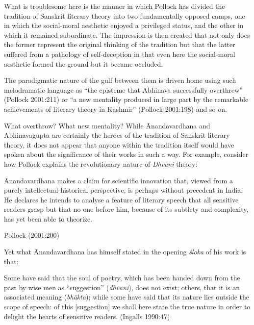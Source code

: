 What is troublesome here is the manner in which Pollock has divided the tradition of Sanskrit literary theory into two fundamentally opposed camps, one in which the social-moral aesthetic enjoyed a privileged status, and the other in which it remained subordinate. The impression is then created that not only does the former represent the original thinking of the tradition but that the latter suffered from a pathology of self-deception in that even here the social-moral aesthetic formed the ground but it became occluded. 

The paradigmatic nature of the gulf between them is driven home using such melodramatic language as ``the episteme that Abhinava successfully overthrew'' (Pollock 2001:211) or ``a new mentality produced in large part by the remarkable achievements of literary theory in Kashmir'' (Pollock 2001:198) and so on. 

What overthrow? What new mentality? While Ānandavardhana and Abhinavagupta are certainly the heroes of the tradition of Sanskrit literary theory, it does not appear that anyone within the tradition itself would have spoken about the significance of their works in such a way. For example, consider how Pollock explains the revolutionary nature of \textsl{Dhvani} theory:  

\begin{myquote}
Ānandavardhana makes a claim for scientific innovation that, viewed from a purely intellectual-historical perspective, is perhaps without precedent in India. He declares he intends to analyse a feature of literary speech that all sensitive readers grasp but that no one before him, because of its subtlety and complexity, has yet been able to theorize. 

\hfill Pollock (2001:200)
\end{myquote}

Yet what Ānandavardhana has himself stated in the opening \textsl{śloka} of his work is that:

\begin{myquote}
Some have said that the soul of poetry, which has been handed down from the past by wise men as ``suggestion'' (\textsl{dhvani}), does not exist; others, that it is an associated meaning (\textsl{bhākta}); while some have said that its nature lies outside the scope of speech: of this [suggestion] we shall here state the true nature in order to delight the hearts of sensitive readers. 
\hfill (Ingalls 1990:47)
\end{myquote}

